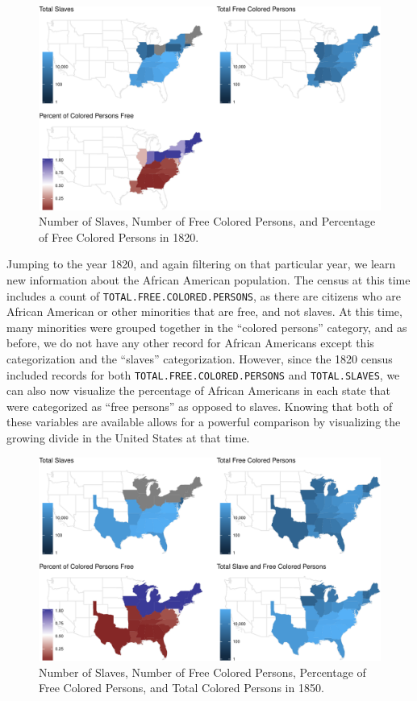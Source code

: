 \documentclass[11pt,]{article}
\begin{document}
\begin{figure}[htbp]
\centering
\includegraphics{writeup_files/figure-latex/unnamed-chunk-5-1.pdf}
\caption{Number of Slaves, Number of Free Colored Persons, and
Percentage of Free Colored Persons in 1820.}
\end{figure}

Jumping to the year 1820, and again filtering on that particular year,
we learn new information about the African American population. The
census at this time includes a count of
\texttt{TOTAL.FREE.COLORED.PERSONS}, as there are citizens who are
African American or other minorities that are free, and not slaves. At
this time, many minorities were grouped together in the ``colored
persons'' category, and as before, we do not have any other record for
African Americans except this categorization and the ``slaves''
categorization. However, since the 1820 census included records for both
\texttt{TOTAL.FREE.COLORED.PERSONS} and \texttt{TOTAL.SLAVES}, we can
also now visualize the percentage of African Americans in each state
that were categorized as ``free persons'' as opposed to slaves. Knowing
that both of these variables are available allows for a powerful
comparison by visualizing the growing divide in the United States at
that time.

\begin{figure}[htbp]
\centering
\includegraphics{writeup_files/figure-latex/unnamed-chunk-6-1.pdf}
\caption{Number of Slaves, Number of Free Colored Persons, Percentage of
Free Colored Persons, and Total Colored Persons in 1850.}
\end{figure}
\end{document}
